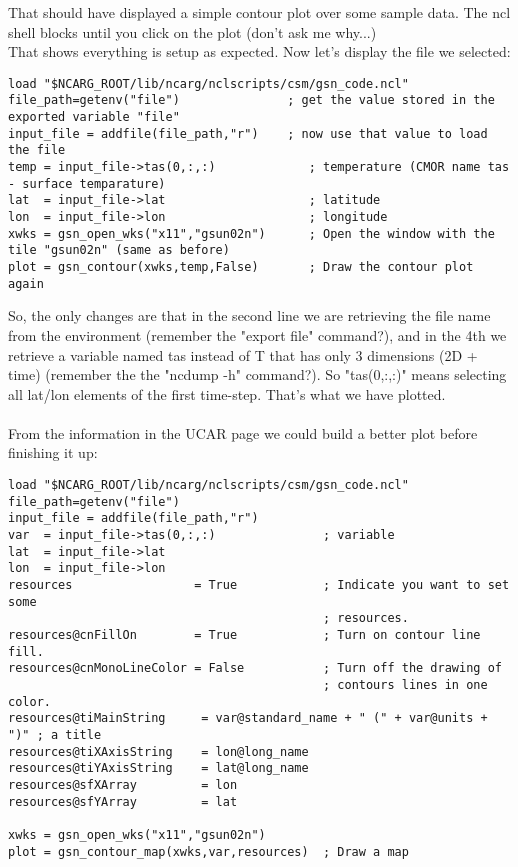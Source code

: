 \documentclass[a4paper,11pt]{ltxdoc}
\begin{document}
That should have displayed a simple contour plot over some sample data. The ncl shell blocks until you click on the plot (don't ask me why...)\\
That shows everything is setup as expected. Now let's display the file we selected:
\begin{verbatim}
load "$NCARG_ROOT/lib/ncarg/nclscripts/csm/gsn_code.ncl" 
file_path=getenv("file")               ; get the value stored in the exported variable "file" 
input_file = addfile(file_path,"r")    ; now use that value to load the file
temp = input_file->tas(0,:,:)             ; temperature (CMOR name tas - surface temparature)
lat  = input_file->lat                    ; latitude
lon  = input_file->lon                    ; longitude
xwks = gsn_open_wks("x11","gsun02n")      ; Open the window with the tile "gsun02n" (same as before)
plot = gsn_contour(xwks,temp,False)       ; Draw the contour plot again
\end{verbatim}
So, the only changes are that in the second line we are retrieving the file name from the environment (remember the "export file" command?), and in the 4th we retrieve a variable named tas instead of T that has only 3 dimensions (2D + time) (remember the the "ncdump -h" command?). So "tas(0,:,:)" means selecting all lat/lon elements of the first time-step. That's what we have plotted. \\
\\
From the information in the UCAR page we could build a better plot before finishing it up:
\begin{verbatim}
load "$NCARG_ROOT/lib/ncarg/nclscripts/csm/gsn_code.ncl" 
file_path=getenv("file")
input_file = addfile(file_path,"r")
var  = input_file->tas(0,:,:)               ; variable
lat  = input_file->lat                      
lon  = input_file->lon                      
resources                 = True            ; Indicate you want to set some
                                            ; resources.
resources@cnFillOn        = True            ; Turn on contour line fill.
resources@cnMonoLineColor = False           ; Turn off the drawing of
                                            ; contours lines in one color.
resources@tiMainString     = var@standard_name + " (" + var@units + ")" ; a title
resources@tiXAxisString    = lon@long_name
resources@tiYAxisString    = lat@long_name
resources@sfXArray         = lon
resources@sfYArray         = lat

xwks = gsn_open_wks("x11","gsun02n") 
plot = gsn_contour_map(xwks,var,resources)  ; Draw a map
\end{verbatim}
\end{document}
